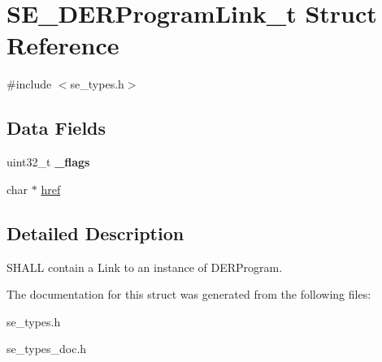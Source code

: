 \hypertarget{structSE__DERProgramLink__t}{}\section{S\+E\+\_\+\+D\+E\+R\+Program\+Link\+\_\+t Struct Reference}
\label{structSE__DERProgramLink__t}


{\ttfamily \#include $<$se\+\_\+types.\+h$>$}

\subsection*{Data Fields}
\begin{DoxyCompactItemize}
\item 
uint32\+\_\+t {\bfseries \+\_\+flags}
\item 
char $\ast$ \hyperlink{group__DERProgramLink_ga5d47abe94156f8aac48f4fa5a0aae3c6}{href}
\end{DoxyCompactItemize}


\subsection{Detailed Description}
S\+H\+A\+LL contain a Link to an instance of D\+E\+R\+Program. 

The documentation for this struct was generated from the following files\+:\begin{DoxyCompactItemize}
\item 
se\+\_\+types.\+h\item 
se\+\_\+types\+\_\+doc.\+h\end{DoxyCompactItemize}
